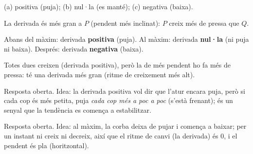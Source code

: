 \begin{solucions}
\begin{sollist}
  \item (a) positiva (puja); \quad (b) nul·la (es manté); \quad (c) negativa (baixa).
  \item La derivada és més gran a $P$ (pendent més inclinat): $P$ creix més de pressa
        que $Q$.
  \item Abans del màxim: derivada \textbf{positiva} (puja). Al màxim: derivada
        \textbf{nul·la} (ni puja ni baixa). Després: derivada \textbf{negativa} (baixa).
  \item Totes dues creixen (derivada positiva), però la de més pendent ho fa més de
        pressa: té una derivada més gran (ritme de creixement més alt).
  \item Resposta oberta. Idea: la derivada positiva vol dir que l'atur encara puja, però
        si cada cop és més petita, puja \emph{cada cop més a poc a poc} (s'està frenant);
        és un senyal que la tendència es comença a estabilitzar.
  \item Resposta oberta. Idea: al màxim, la corba deixa de pujar i comença a baixar; per
        un instant ni creix ni decreix, així que el ritme de canvi (la derivada) és $0$,
        i el pendent és pla (horitzontal).
\end{sollist}
\end{solucions}
